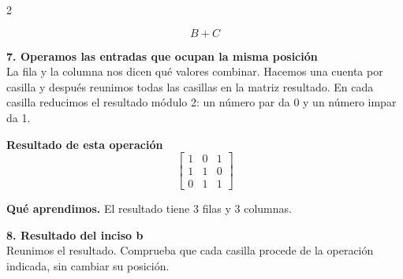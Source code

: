 \documentclass[11pt,a4paper,landscape]{article}
\begin{document}
\begin{multicols*}{2}
\begin{minipage}{\linewidth}
\[B+C\]
\end{minipage}\par\medskip
\noindent\begin{minipage}{\linewidth}\textbf{7. Operamos las entradas que ocupan la misma posición}\\[2pt]La fila y la columna nos dicen qué valores combinar. Hacemos una cuenta por casilla y después reunimos todas las casillas en la matriz resultado. En cada casilla reducimos el resultado módulo 2: un número par da 0 y un número impar da 1.
\par{}\par\smallskip
\par\smallskip \textbf{Resultado de esta operación}\[\begin{bmatrix}1 & 0 & 1\\1 & 1 & 0\\0 & 1 & 1\end{bmatrix}\]
\par\smallskip\textbf{Qué aprendimos.} El resultado tiene 3 filas y 3 columnas.
\end{minipage}\par\medskip
\noindent\begin{minipage}{\linewidth}\textbf{8. Resultado del inciso b}\\[2pt]Reunimos el resultado. Comprueba que cada casilla procede de la operación indicada, sin cambiar su posición.

\end{minipage}
\end{multicols*}
\end{document}
